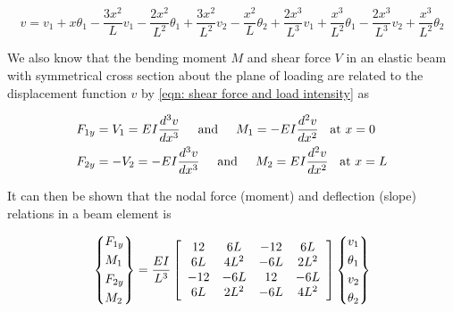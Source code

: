 \documentclass[a4paper,openany,nobib]{tufte-book}
\begin{document}
{{$$v = v_1 + x\theta_1 - \frac{3x^2}{L}v_1 - \frac{2x^2}{L^2}\theta_1 + \frac{3x^2}{L^2}v_2 - \frac{x^2}{L}\theta_2 + \frac{2x^3}{L^3}v_1 + \frac{x^3}{L^2}\theta_1 - \frac{2x^3}{L^3}v_2 + \frac{x^3}{L^2}\theta_2$$

We also know that the bending moment \(M\) and shear force \(V\) in an
elastic beam with symmetrical cross section about the plane of loading
are related to the displacement function \(v\) by
\ref{eqn: shear force and load intensity}
as

$$\begin{gathered}
  F_{1y} = V_1 = EI\frac{d^3v}{dx^3} \hspace{0.5cm} \text{and} \hspace{0.5cm}
  M_1 =  -EI\frac{d^2v}{dx^2} \hspace{0.2cm} \text{ at }x = 0 \hfill \\
  F_{2y} =  -V_2 =  - EI\frac{d^3v}{dx^3} \hspace{0.5cm} \text{and}
  \hspace{0.5cm} M_2 = EI\frac{d^2v}{dx^2} \hspace{0.2cm} \text{ at }x = L \hfill \\ \end{gathered}$$

It can then be shown that the nodal force (moment) and deflection
(slope) relations in a beam element is

\begin{gather*}
  \left\{ \begin{gathered}
      F_{1y} \hfill \\
      M_1 \hfill \\
      F_{2y} \hfill \\
      M_2 \hfill \\ 
    \end{gathered}
  \right\} = \frac{EI}{L^3}
  \left[
    \begin{array}{*{20}{c}}
      12&6L&-12&6L \\ 
      6L&4L^2&-6L&2L^2 \\ 
      -12&-6L&12&-6L \\ 
      6L&2L^2&-6L&4L^2 
    \end{array}
  \right]
  \left\{
    \begin{gathered}
      v_1 \hfill \\
      \theta _1 \hfill \\
      v_2 \hfill \\
      \theta _2 \hfill \\ 
    \end{gathered}
  \right\}
\end{gather*}

}}
\end{document}

